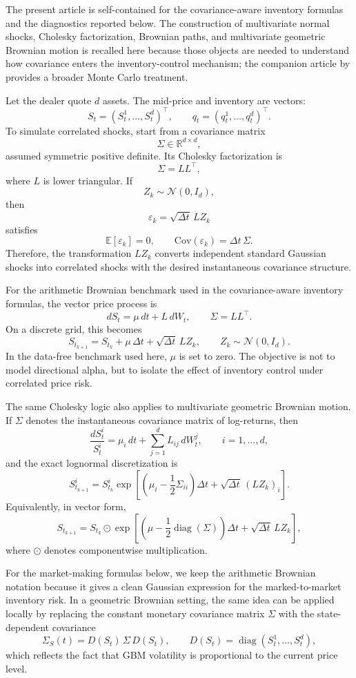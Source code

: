 The present article is self-contained for the covariance-aware inventory formulas and the diagnostics reported below. The construction of multivariate normal shocks, Cholesky factorization, Brownian paths, and multivariate geometric Brownian motion is recalled here because those objects are needed to understand how covariance enters the inventory-control mechanism; the companion article by \textcite{RostagnoFlorio2026MonteCarlo} provides a broader Monte Carlo treatment.

Let the dealer quote $d$ assets. The mid-price and inventory are vectors:
\[
S_t=(S_t^1,\ldots,S_t^d)^\top,\qquad
q_t=(q_t^1,\ldots,q_t^d)^\top .
\]
To simulate correlated shocks, start from a covariance matrix
\[
\Sigma\in\mathbb{R}^{d\times d},
\]
assumed symmetric positive definite. Its Cholesky factorization is
\[
\Sigma=LL^\top,
\]
where $L$ is lower triangular. If
\[
Z_k\sim\mathcal{N}(0,I_d),
\]
then
\[
\varepsilon_k=\sqrt{\Delta t}\,LZ_k
\]
satisfies
\[
\mathbb{E}[\varepsilon_k]=0,
\qquad
\mathrm{Cov}(\varepsilon_k)=\Delta t\,\Sigma .
\]
Therefore, the transformation $LZ_k$ converts independent standard Gaussian shocks into correlated shocks with the desired instantaneous covariance structure.

For the arithmetic Brownian benchmark used in the covariance-aware inventory formulas, the vector price process is
\[
dS_t=\mu\,dt+L\,dW_t,
\qquad
\Sigma=LL^\top.
\]
On a discrete grid, this becomes
\[
S_{t_{k+1}}=S_{t_k}+\mu\,\Delta t+\sqrt{\Delta t}\,LZ_k,
\qquad
Z_k\sim\mathcal{N}(0,I_d).
\]
In the data-free benchmark used here, $\mu$ is set to zero. The objective is not to model directional alpha, but to isolate the effect of inventory control under correlated price risk.

The same Cholesky logic also applies to multivariate geometric Brownian motion. If $\Sigma$ denotes the instantaneous covariance matrix of log-returns, then
\[
\frac{dS_t^i}{S_t^i}
=
\mu_i\,dt+\sum_{j=1}^{d}L_{ij}\,dW_t^j,
\qquad i=1,\ldots,d,
\]
and the exact lognormal discretization is
\[
S_{t_{k+1}}^i
=
S_{t_k}^i
\exp\!\left[
\left(\mu_i-\frac{1}{2}\Sigma_{ii}\right)\Delta t
+
\sqrt{\Delta t}\,(LZ_k)_i
\right].
\]
Equivalently, in vector form,
\[
S_{t_{k+1}}
=
S_{t_k}\odot
\exp\!\left[
\left(\mu-\frac{1}{2}\operatorname{diag}(\Sigma)\right)\Delta t
+
\sqrt{\Delta t}\,LZ_k
\right],
\]
where $\odot$ denotes componentwise multiplication.

For the market-making formulas below, we keep the arithmetic Brownian notation because it gives a clean Gaussian expression for the marked-to-market inventory risk. In a geometric Brownian setting, the same idea can be applied locally by replacing the constant monetary covariance matrix $\Sigma$ with the state-dependent covariance
\[
\Sigma_S(t)
=
D(S_t)\,\Sigma\,D(S_t),
\qquad
D(S_t)=\operatorname{diag}(S_t^1,\ldots,S_t^d),
\]
which reflects the fact that GBM volatility is proportional to the current price level.


